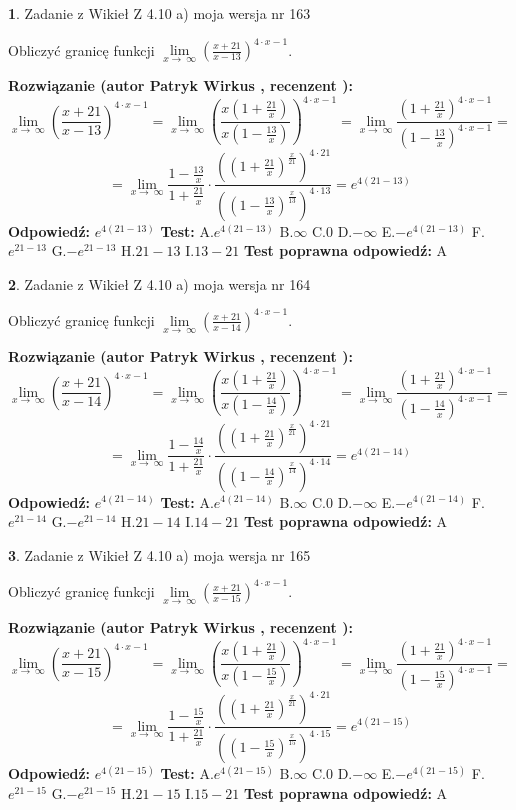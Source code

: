 \documentclass[12pt, a4paper]{article}
\theoremstyle{definition} %
\newtheorem{zad}{}
\newcommand{\zadStart}[1]{\begin{zad}#1\newline}
\newcommand{\zadStop}{\end{zad}}
\newcommand{\rozwStart}[2]{\noindent \textbf{Rozwiązanie (autor #1 , recenzent #2): }\newline}
\newcommand{\rozwStop}{\newline}
\newcommand{\odpStart}{\noindent \textbf{Odpowiedź:}\newline}
\newcommand{\odpStop}{\newline}
\newcommand{\testStart}{\noindent \textbf{Test:}\newline}
\newcommand{\testStop}{\newline}
\newcommand{\kluczStart}{\noindent \textbf{Test poprawna odpowiedź:}\newline}
\newcommand{\kluczStop}{\newline}
\begin{document}
\zadStart{Zadanie z Wikieł Z 4.10 a) moja wersja nr 163}


Obliczyć granicę funkcji  $\lim\limits_{x\to\ \infty}(\frac{x+21}{x-13})^{4\cdot x-1}$.
\zadStop
\rozwStart{Patryk Wirkus}{}
$$\lim\limits_{x\to\ \infty}(\frac{x+21}{x-13})^{4\cdot x-1} = \lim\limits_{x\to\ \infty}(\frac{x(1+\frac{21}{x})}{x(1-\frac{13}{x})})^{4\cdot x-1}=\lim\limits_{x\to\ \infty}\frac{(1+\frac{21}{x})^{4\cdot x-1}}{(1-\frac{13}{x})^{4\cdot x-1}}=$$
$$=\lim\limits_{x\to\ \infty}\frac{1-\frac{13}{x}}{1+\frac{21}{x}}\cdot\frac{((1+\frac{21}{x})^{\frac{x}{21}})^{4\cdot21}}{((1-\frac{13}{x})^{\frac{x}{13}})^{4\cdot13}}=e^{4(21-13)}$$
\rozwStop
\odpStart
$e^{4(21-13)}$
\odpStop
\testStart
A.$e^{4(21-13)}$ B.$\infty$ C.$0$ D.$-\infty$ E.$-e^{4(21-13)}$
F.$e^{21-13}$ G.$-e^{21-13}$
H.$21-13$
I.$13-21$
\testStop
\kluczStart
A
\kluczStop



\zadStart{Zadanie z Wikieł Z 4.10 a) moja wersja nr 164}


Obliczyć granicę funkcji  $\lim\limits_{x\to\ \infty}(\frac{x+21}{x-14})^{4\cdot x-1}$.
\zadStop
\rozwStart{Patryk Wirkus}{}
$$\lim\limits_{x\to\ \infty}(\frac{x+21}{x-14})^{4\cdot x-1} = \lim\limits_{x\to\ \infty}(\frac{x(1+\frac{21}{x})}{x(1-\frac{14}{x})})^{4\cdot x-1}=\lim\limits_{x\to\ \infty}\frac{(1+\frac{21}{x})^{4\cdot x-1}}{(1-\frac{14}{x})^{4\cdot x-1}}=$$
$$=\lim\limits_{x\to\ \infty}\frac{1-\frac{14}{x}}{1+\frac{21}{x}}\cdot\frac{((1+\frac{21}{x})^{\frac{x}{21}})^{4\cdot21}}{((1-\frac{14}{x})^{\frac{x}{14}})^{4\cdot14}}=e^{4(21-14)}$$
\rozwStop
\odpStart
$e^{4(21-14)}$
\odpStop
\testStart
A.$e^{4(21-14)}$ B.$\infty$ C.$0$ D.$-\infty$ E.$-e^{4(21-14)}$
F.$e^{21-14}$ G.$-e^{21-14}$
H.$21-14$
I.$14-21$
\testStop
\kluczStart
A
\kluczStop



\zadStart{Zadanie z Wikieł Z 4.10 a) moja wersja nr 165}


Obliczyć granicę funkcji  $\lim\limits_{x\to\ \infty}(\frac{x+21}{x-15})^{4\cdot x-1}$.
\zadStop
\rozwStart{Patryk Wirkus}{}
$$\lim\limits_{x\to\ \infty}(\frac{x+21}{x-15})^{4\cdot x-1} = \lim\limits_{x\to\ \infty}(\frac{x(1+\frac{21}{x})}{x(1-\frac{15}{x})})^{4\cdot x-1}=\lim\limits_{x\to\ \infty}\frac{(1+\frac{21}{x})^{4\cdot x-1}}{(1-\frac{15}{x})^{4\cdot x-1}}=$$
$$=\lim\limits_{x\to\ \infty}\frac{1-\frac{15}{x}}{1+\frac{21}{x}}\cdot\frac{((1+\frac{21}{x})^{\frac{x}{21}})^{4\cdot21}}{((1-\frac{15}{x})^{\frac{x}{15}})^{4\cdot15}}=e^{4(21-15)}$$
\rozwStop
\odpStart
$e^{4(21-15)}$
\odpStop
\testStart
A.$e^{4(21-15)}$ B.$\infty$ C.$0$ D.$-\infty$ E.$-e^{4(21-15)}$
F.$e^{21-15}$ G.$-e^{21-15}$
H.$21-15$
I.$15-21$
\testStop
\kluczStart
A
\kluczStop
\end{document}
